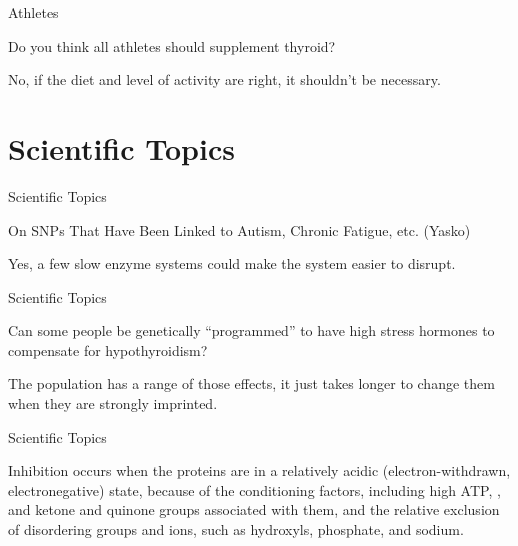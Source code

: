 \documentclass[11pt,oneside,openany,extrafontsizes]{memoir}
\begin{document}
\begin{qaexchange}{Athletes}

    \begin{question}
        Do you think all athletes should supplement thyroid?
    \end{question}

    \begin{answer}
        No, if the diet and level of activity are right, it shouldn't be necessary.
    \end{answer}
\end{qaexchange}

\section{Scientific Topics}

\begin{standalonequote}{Scientific Topics}
    \begin{note}
        On SNPs That Have Been Linked to Autism, Chronic Fatigue, etc. (Yasko)
    \end{note}

    \begin{answer}
        Yes, a few slow enzyme systems could make the system easier to disrupt.
    \end{answer}
\end{standalonequote}

\begin{qaexchange}{Scientific Topics}

    \begin{question}
        Can some people be genetically \enquote{programmed} to have high stress hormones to compensate for hypothyroidism?
    \end{question}

    \begin{answer}
        The population has a range of those effects, it just takes longer to change them when they are strongly imprinted.
    \end{answer}
\end{qaexchange}

\begin{standalonequote}{Scientific Topics}

    \begin{answer}
        Inhibition occurs when the proteins are in a relatively acidic (electron-withdrawn, electronegative) state, because of the conditioning factors, including high ATP, , and ketone and quinone groups associated with them, and the relative exclusion of disordering groups and ions, such as hydroxyls, phosphate, and sodium. 
    \end{answer}
\end{standalonequote}
\end{document}
